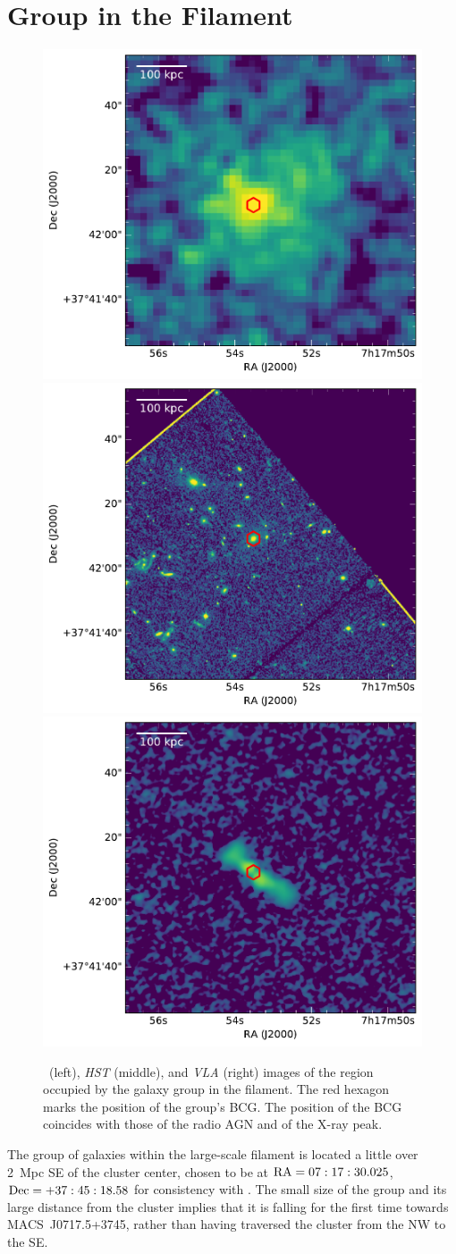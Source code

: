 \section{Group in the Filament}
\label{sec:Group}

\begin{figure}
	\includegraphics[height=0.33\textwidth]{plots/group-xray.pdf}
	\includegraphics[height=0.33\textwidth, trim={3.3cm 0 0 0}, clip]{plots/group-optical.pdf}
	\includegraphics[height=0.33\textwidth, trim={3.3cm 0 0 0}, clip]{plots/group-radio.pdf}
	\caption{\chandra\ (left), \emph{HST} (middle), and \emph{VLA} (right) images of the region occupied by the galaxy group in the filament. The red hexagon marks the position of the group's BCG. The position of the BCG coincides with those of the radio AGN and of the X-ray peak.\label{fig:group}}
\end{figure}

The group of galaxies within the large-scale filament is located a little over 2~Mpc SE of the cluster center, chosen to be at ${\rm RA} = 07:17:30.025$, ${\rm Dec} = +37:45:18.58$ for consistency with \citet{Jauzac2012}. The small size of the group and its large distance from the cluster implies that it is falling for the first time towards MACS~J0717.5+3745, rather than having traversed the cluster from the NW to the SE.

